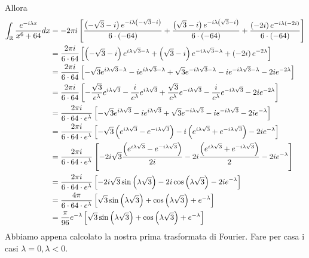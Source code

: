 Allora
\begin{align*}
\int_{\mathbb{R}}\frac{e^{- i\lambda x}}{x^{6} + 64} dx & = - 2\pi i\left[\frac{\left(- \sqrt{3} - i\right) e^{- i\lambda \left(- \sqrt{3} - i\right)}}{6 \cdot \left(- 64\right)} + \frac{\left(\sqrt{3} - i\right) e^{- i\lambda \left(\sqrt{3} - i\right)}}{6 \cdot \left(- 64\right)} + \frac{\left(- 2i\right) e^{- i\lambda \left(- 2i\right)}}{6 \cdot \left(- 64\right)}\right]\\
 & = \frac{2\pi i}{6 \cdot 64}\left[\left(- \sqrt{3} - i\right) e^{i\lambda \sqrt{3} - \lambda} + \left(\sqrt{3} - i\right) e^{- i\lambda \sqrt{3} - \lambda} + \left(- 2i\right) e^{- 2\lambda}\right]\\
 & = \frac{2\pi i}{6 \cdot 64}\left[ - \sqrt{3} e^{i\lambda \sqrt{3} - \lambda} - ie^{i\lambda \sqrt{3} - \lambda} + \sqrt{3} e^{- i\lambda \sqrt{3} - \lambda} - ie^{- i\lambda \sqrt{3} - \lambda} - 2ie^{- 2\lambda}\right]\\
 & = \frac{2\pi i}{6 \cdot 64}\left[ - \frac{\sqrt{3}}{e^{\lambda}} e^{i\lambda \sqrt{3}} - \frac{i}{e^{\lambda}} e^{i\lambda \sqrt{3}} + \frac{\sqrt{3}}{e^{\lambda}} e^{- i\lambda \sqrt{3}} - \frac{i}{e^{\lambda}} e^{- i\lambda \sqrt{3}} - 2ie^{- 2\lambda}\right]\\
 & = \frac{2\pi i}{6 \cdot 64 \cdot e^{\lambda}}\left[ - \sqrt{3} e^{i\lambda \sqrt{3}} - ie^{i\lambda \sqrt{3}} + \sqrt{3} e^{- i\lambda \sqrt{3}} - ie^{- i\lambda \sqrt{3}} - 2ie^{- \lambda}\right]\\
 & = \frac{2\pi i}{6 \cdot 64 \cdot e^{\lambda}}\left[ - \sqrt{3}\left(e^{i\lambda \sqrt{3}} - e^{- i\lambda \sqrt{3}}\right) - i\left(e^{i\lambda \sqrt{3}} + e^{- i\lambda \sqrt{3}}\right) - 2ie^{- \lambda}\right]\\
 & = \frac{2\pi i}{6 \cdot 64 \cdot e^{\lambda}}\left[ - 2i\sqrt{3}\frac{\left(e^{i\lambda \sqrt{3}} - e^{- i\lambda \sqrt{3}}\right)}{2i} - 2i\frac{\left(e^{i\lambda \sqrt{3}} + e^{- i\lambda \sqrt{3}}\right)}{2} - 2ie^{- \lambda}\right]\\
 & = \frac{2\pi i}{6 \cdot 64 \cdot e^{\lambda}}\left[ - 2i\sqrt{3}\sin\left(\lambda \sqrt{3}\right) - 2i\cos\left(\lambda \sqrt{3}\right) - 2ie^{- \lambda}\right]\\
 & = \frac{4\pi}{6 \cdot 64 \cdot e^{\lambda}}\left[\sqrt{3}\sin\left(\lambda \sqrt{3}\right) + \cos\left(\lambda \sqrt{3}\right) + e^{- \lambda}\right]\\
 & = \frac{\pi}{96} e^{- \lambda}\left[\sqrt{3}\sin\left(\lambda \sqrt{3}\right) + \cos\left(\lambda \sqrt{3}\right) + e^{- \lambda}\right]
\end{align*}
Abbiamo appena calcolato la nostra prima trasformata di Fourier. Fare per casa i casi $\lambda = 0, \lambda < 0$.
\Soluzione

